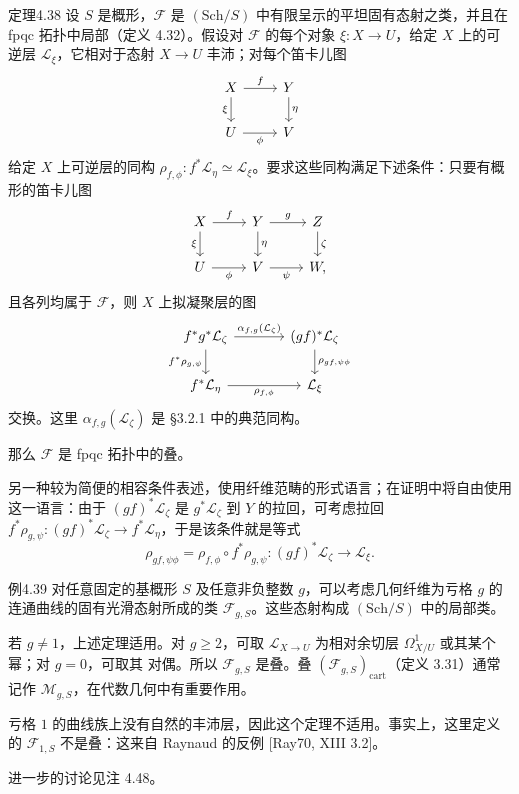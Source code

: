 \begin{origstatement}{定理}{4.38}\label{ch04:thm438}
设 $S$ 是概形，$\mathcal F$ 是 $(\mathrm{Sch}/S)$ 中有限呈示的平坦固有态射之类，并且在 fpqc 拓扑中局部（定义 4.32）。假设对 $\mathcal F$ 的每个对象 $\xi\colon X\to U$，给定 $X$ 上的可逆层 $\mathcal L_\xi$，它相对于态射 $X\to U$ 丰沛；对每个笛卡儿图
\[
\begin{tikzcd}
 X\arrow[r,"{f}"]\arrow[d,"{\xi}"']&Y\arrow[d,"{\eta}"]\\
 U\arrow[r,"{\phi}"']&V
\end{tikzcd}
\]
给定 $X$ 上可逆层的同构 $\rho_{f,\phi}\colon f^*\mathcal L_\eta\simeq\mathcal L_\xi$。要求这些同构满足下述条件：只要有概形的笛卡儿图
\[
\begin{tikzcd}
 X\arrow[r,"{f}"]\arrow[d,"{\xi}"']&Y\arrow[r,"{g}"]\arrow[d,"{\eta}"]&Z\arrow[d,"{\zeta}"]\\
 U\arrow[r,"{\phi}"']&V\arrow[r,"{\psi}"']&W,
\end{tikzcd}
\]
且各列均属于 $\mathcal F$，则 $X$ 上拟凝聚层的图
\[
\begin{tikzcd}[column sep=large]
 f^*g^*\mathcal L_\zeta\arrow[r,"{\alpha_{f,g}(\mathcal L_\zeta)}"]\arrow[d,"{f^*\rho_{g,\psi}}"']&(gf)^*\mathcal L_\zeta\arrow[d,"{\rho_{gf,\psi\phi}}"]\\
 f^*\mathcal L_\eta\arrow[r,"{\rho_{f,\phi}}"']&\mathcal L_\xi
\end{tikzcd}
\]
交换。这里 $\alpha_{f,g}(\mathcal L_\zeta)$ 是 §3.2.1 中的典范同构。

那么 $\mathcal F$ 是 fpqc 拓扑中的叠。
\end{origstatement}

另一种较为简便的相容条件表述，使用纤维范畴的形式语言；在证明中将自由使用这一语言：由于 $(gf)^*\mathcal L_\zeta$ 是 $g^*\mathcal L_\zeta$ 到 $Y$ 的拉回，可考虑拉回 $f^*\rho_{g,\psi}\colon(gf)^*\mathcal L_\zeta\to f^*\mathcal L_\eta$，于是该条件就是等式
\[
 \rho_{gf,\psi\phi}=\rho_{f,\phi}\circ f^*\rho_{g,\psi}
 \colon(gf)^*\mathcal L_\zeta\longrightarrow\mathcal L_\xi.
\]

\begin{origstatement}{例}{4.39}\label{ch04:ex439}
对任意固定的基概形 $S$ 及任意非负整数 $g$，可以考虑几何纤维为亏格 $g$ 的连通曲线的固有光滑态射所成的类 $\mathcal F_{g,S}$。这些态射构成 $(\mathrm{Sch}/S)$ 中的局部类。

若 $g\ne1$，上述定理适用。对 $g\geq2$，可取 $\mathcal L_{X\to U}$ 为相对余切层 $\Omega^1_{X/U}$ 或其某个幂；对 $g=0$，可取其
对偶。所以 $\mathcal F_{g,S}$ 是叠。叠 $(\mathcal F_{g,S})_{\mathrm{cart}}$（定义 3.31）通常记作 $\mathcal M_{g,S}$，在代数几何中有重要作用。

亏格 $1$ 的曲线族上没有自然的丰沛层，因此这个定理不适用。事实上，这里定义的 $\mathcal F_{1,S}$ 不是叠：这来自 Raynaud 的反例 [Ray70, XIII 3.2]。

进一步的讨论见注 4.48。
\end{origstatement}

